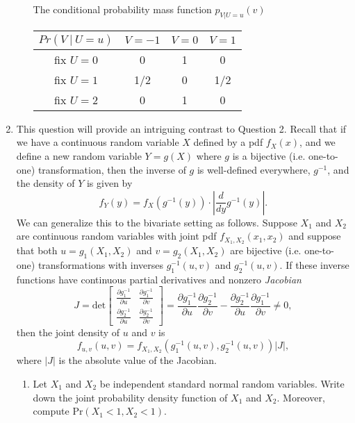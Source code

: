 \documentclass[11pt]{article}
\newcommand{\pr}{\text{Pr}}
\begin{document}
\begin{enumerate}[label=\textbf{Question \arabic*:},start=1]
\begin{enumerate}
	The conditional probability mass function $p_{V | U=u}(v)$
\begin{center}
 \begin{tabular}{|| c c c c ||} 
 \hline
 $Pr(V\ | \ U= u)$ & $V=-1$ & $V=0$ & $V=1$ \\ [0.5ex] 
 \hline\hline
 fix $U=0$ & 0 & 1 & 0  \\ 
 \hline
 fix $U=1$ & 1/2 & 0 & 1/2  \\
 \hline
 fix $U=2$ & 0 & 1 & 0 \\
 \hline
\end{tabular}
\end{center}

\end{enumerate}






\item 
This question will provide an intriguing contrast to Question 2. Recall that if we have a continuous random variable $X$ defined by a pdf $f_X(x)$, and we define a new random variable $Y = g(X)$ where $g$ is a bijective (i.e. one-to-one) transformation, then the inverse of $g$ is well-defined everywhere, $g^{-1}$, and the density of $Y$ is given by $$f_Y(y) = f_X(g^{-1}(y))\cdot \left| \frac d{dy} g^{-1}(y)\right|.$$ We can generalize this to the bivariate setting as follows. Suppose $X_1$ and $X_2$ are continuous random variables with joint pdf $f_{X_1,X_2}(x_1,x_2)$ and suppose that both $u = g_1(X_1,X_2)$ and $v = g_2(X_1,X_2)$ are bijective (i.e. one-to-one) transformations with inverses $g_1^{-1}(u,v)$ and $g_2^{-1}(u,v)$. If these inverse functions have continuous partial derivatives and nonzero {\em Jacobian} 
\[
J = \text{det}
\begin{bmatrix}
	\frac {\partial g_1^{-1}}{\partial u}	& \frac {\partial g_1^{-1}}{\partial v} \\
	\frac {\partial g_2^{-1}}{\partial u}	& \frac {\partial g_2^{-1}}{\partial v}
\end{bmatrix}
= \frac {\partial g_1^{-1}}{\partial u} \frac {\partial g_2^{-1}}{\partial v} - \frac {\partial g_2^{-1}}{\partial u} \frac {\partial g_1^{-1}}{\partial v} \neq 0,
\]
then the joint density of $u$ and $v$ is $$f_{u,v}(u,v) = f_{X_1,X_2}\left( g_1^{-1}(u,v), g_2^{-1}(u,v)\right) |J|,$$ where $|J|$ is the absolute value of the Jacobian.

\begin{enumerate}
  \item Let $X_1$ and $X_2$ be independent standard normal random variables. Write down the joint probability density function of $X_1$ and $X_2$. Moreover, compute $\pr(X_1<1,X_2<1)$.\\
  

\end{enumerate}
\end{enumerate}
\end{document}
